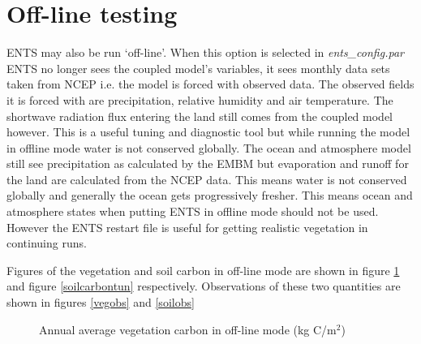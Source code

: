 \documentclass[10pt,a4paper]{report}
\begin{document}
\section{Off-line testing}

ENTS may also be run `off-line'. When this option is selected in
{\em ents\_config.par} ENTS no longer sees the coupled model's
variables, it sees monthly data sets taken from NCEP i.e. the model
is forced with observed data. The observed fields it is forced with
are precipitation, relative humidity and air temperature. The
shortwave radiation flux entering the land still comes from the
coupled model however. This is a useful tuning and diagnostic tool
but while running the model in offline mode water is not conserved
globally. The ocean and atmosphere model still see precipitation as
calculated by the EMBM but evaporation and runoff for the land are
calculated from the NCEP data. This means water is not conserved
globally and generally the ocean gets progressively fresher. This
means ocean and atmosphere states when putting ENTS in offline mode
should not be used. However the ENTS restart file is useful for
getting realistic vegetation in continuing runs.

Figures of the vegetation and soil carbon in off-line mode are
shown in figure \ref{vegcarbontun} and figure \ref{soilcarbontun}
respectively. Observations of these two quantities are shown in
figures \ref{vegobs} and \ref{soilobs}

\begin{figure}
\centerline{}
\caption{Annual average vegetation carbon in off-line mode (kg
C/m$^{2}$)}\label{vegcarbontun}
\end{figure}
\end{document}
